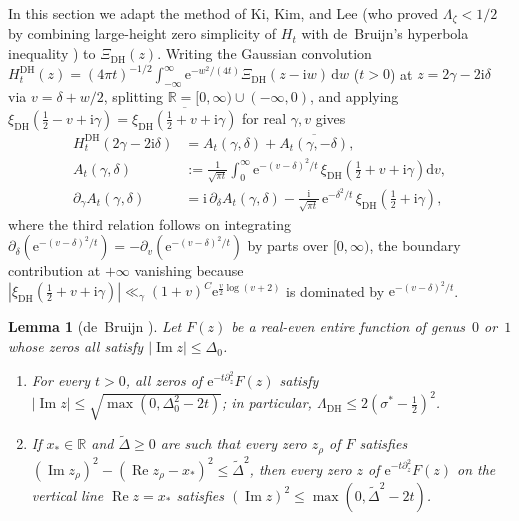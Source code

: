 \documentclass[11pt,a4paper,reqno]{amsart}
\newtheorem{lemma}[theorem]{Lemma}
\theoremstyle{definition}
\theoremstyle{remark}
\numberwithin{equation}{section}
\newcommand{\R}{\mathbb{R}}
\newcommand{\dd}{\mathrm{d}}
\newcommand{\ii}{\mathrm{i}}
\newcommand{\ee}{\mathrm{e}}
\DeclareMathOperator{\Reop}{Re}
\DeclareMathOperator{\Imop}{Im}
\begin{document}
In this section we adapt the method of Ki, Kim, and Lee \cite{kikimlee2009} (who proved $\Lambda_\zeta < 1/2$ by combining large-height zero simplicity of $H_t$ with de~Bruijn's hyperbola inequality \cite{debruijn1950}) to $\Xi_{\mathrm{DH}}(z)$. Writing the Gaussian convolution $H_t^{\mathrm{DH}}(z) = (4\pi t)^{-1/2}\int_{-\infty}^{\infty}\ee^{-w^2/(4t)}\Xi_{\mathrm{DH}}(z - \ii w)\,\dd w$ ($t > 0$) at $z = 2\gamma - 2\ii\delta$ via $v = \delta + w/2$, splitting $\R = [0,\infty) \cup (-\infty,0)$, and applying $\xi_{\mathrm{DH}}(\frac{1}{2} - v + \ii\gamma) = \overline{\xi_{\mathrm{DH}}(\frac{1}{2} + v + \ii\gamma)}$ for real $\gamma, v$ gives
\begin{equation}
  \begin{aligned}
    H_t^{\mathrm{DH}}(2\gamma - 2\ii\delta) &= A_t(\gamma,\delta) + \overline{A_t(\gamma,-\delta)}, \\
    A_t(\gamma,\delta) &:= \frac{1}{\sqrt{\pi t}}\int_{0}^{\infty}\ee^{-(v-\delta)^2/t}\,\xi_{\mathrm{DH}}\!\left(\tfrac{1}{2} + v + \ii\gamma\right)\dd v, \\
    \partial_\gamma A_t(\gamma,\delta) &= \ii\,\partial_\delta A_t(\gamma,\delta) - \frac{\ii}{\sqrt{\pi t}}\,\ee^{-\delta^2/t}\,\xi_{\mathrm{DH}}\!\left(\tfrac{1}{2} + \ii\gamma\right),
  \end{aligned}
  \label{eq:gauss-halfline}
\end{equation}
where the third relation follows on integrating $\partial_\delta(\ee^{-(v-\delta)^2/t}) = -\partial_v(\ee^{-(v-\delta)^2/t})$ by parts over $[0,\infty)$, the boundary contribution at $+\infty$ vanishing because $|\xi_{\mathrm{DH}}(\frac{1}{2}+v+\ii\gamma)| \ll_\gamma (1+v)^C\ee^{\frac{v}{2}\log(v+2)}$ is dominated by $\ee^{-(v-\delta)^2/t}$.

\begin{lemma}[{de~Bruijn \cite[Thms.~12 and~13]{debruijn1950}}]
\label{lem:debruijn-strip}
Let $F(z)$ be a real-even entire function of genus~$0$ or~$1$ whose zeros all satisfy $|\Imop z| \le \Delta_0$.
\begin{enumerate}[label=\textup{(\roman*)},leftmargin=2.0em]
  \item For every $t > 0$, all zeros of $\ee^{-t\partial_z^2}F(z)$ satisfy $|\Imop z| \le \sqrt{\max(0, \Delta_0^2 - 2t)}$; in particular, $\Lambda_{\mathrm{DH}} \le 2(\sigma^* - \frac{1}{2})^2$.
  \item If $x_* \in \R$ and $\widetilde{\Delta} \ge 0$ are such that every zero $z_\rho$ of $F$ satisfies $(\Imop z_\rho)^2 - (\Reop z_\rho - x_*)^2 \le \widetilde{\Delta}^2$, then every zero $z$ of $\ee^{-t\partial_z^2}F(z)$ on the vertical line $\Reop z = x_*$ satisfies $(\Imop z)^2 \le \max(0, \widetilde{\Delta}^2 - 2t)$.
\end{enumerate}
\end{lemma}
\end{document}
